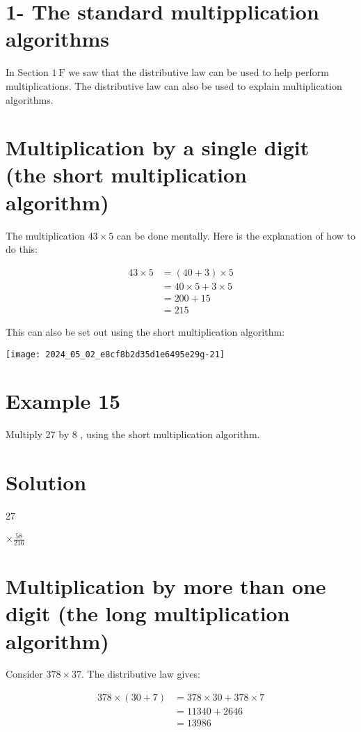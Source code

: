 \documentclass[10pt]{article}
\begin{document}
\section*{1- The standard multipplication algorithms}
In Section \(1 \mathrm{~F}\) we saw that the distributive law can be used to help perform multiplications. The distributive law can also be used to explain multiplication algorithms.

\section*{Multiplication by a single digit (the short multiplication algorithm)}
The multiplication \(43 \times 5\) can be done mentally. Here is the explanation of how to do this:

\[
\begin{aligned}
43 \times 5 & =(40+3) \times 5 \\
& =40 \times 5+3 \times 5 \\
& =200+15 \\
& =215
\end{aligned}
\]

This can also be set out using the short multiplication algorithm:

\begin{center}
\texttt{[image: 2024\_05\_02\_e8cf8b2d35d1e6495e29g-21]}
\end{center}

\section*{Example 15}
Multiply 27 by 8 , using the short multiplication algorithm.

\section*{Solution}
27

\(\times \frac{58}{216}\)

\section*{Multiplication by more than one digit (the long multiplication algorithm)}
Consider \(378 \times 37\). The distributive law gives:

\[
\begin{aligned}
378 \times(30+7) & =378 \times 30+378 \times 7 \\
& =11340+2646 \\
& =13986
\end{aligned}
\]
\end{document}
